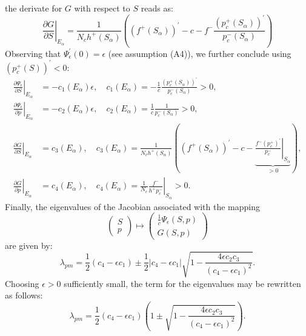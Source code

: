 \documentclass[smallextended]{svjour3}       %
\begin{document}
the derivate for $G$ with respect to $S$ reads as:
$$
\left. \frac{\partial G}{\partial S}  \right|_{E_\alpha} = \frac{1}{N_ch^+ \left( S_\alpha \right)}\left(  \left( f^+\left( S_\alpha \right) \right)^\prime -c  - f^- \frac{\left( p_c^+\left( S_\alpha \right) \right)^\prime }{p_c^-\left( S_\alpha \right)} \right)
$$
Observing that $\Psi_\epsilon^\prime \left(0 \right) = \epsilon$ (see assumption (A4)), we further conclude using $ \left( p_c^+ \left(S \right) \right)^\prime <0$:
\begin{align*}
\left. \frac{\partial \Psi_\epsilon}{\partial S}\right|_{E_\alpha}  &= -c_1\left( E_\alpha \right) \epsilon,\quad c_1\left( E_\alpha \right) = - \frac{1}{c}  
\frac{ \left( p_c^+ \left(S_\alpha \right) \right)^\prime }{ p_c^- \left(S_\alpha \right) } > 0, \\
\left. \frac{\partial \Psi_\epsilon}{\partial p}\right|_{E_\alpha}  &= -c_2\left( E_\alpha \right) \epsilon,\quad c_2\left( E_\alpha \right) = \frac{1}{c}  
\frac{1}{ p_c^- \left(S_\alpha \right) } > 0, \\
\left. \frac{\partial G}{\partial S} \right|_{E_\alpha} &= c_3\left( E_\alpha \right),\quad 
c_3\left( E_\alpha \right) =  \frac{1}{N_ch^+\left( S_\alpha \right)} \left(  \left( f^+\left( S_\alpha \right) \right)^\prime - c - 
 \underbrace{\left. \frac{ f^- \left( p_c^+ \right)^\prime}{p_c^-} \right|_{S_\alpha}}_{>0} \right), \\
\left. \frac{\partial G}{\partial p} \right|_{E_\alpha} &= c_4\left( E_\alpha \right),\quad c_4\left( E_\alpha \right) = \frac{1}{N_c}
\left. \frac{f^-}{h^+ p_c^-} \right|_{S_\alpha} >0.
\end{align*}
Finally, the eigenvalues of the Jacobian associated with the mapping
$$
\begin{pmatrix} S \\ p \end{pmatrix} \mapsto 
\begin{pmatrix} \frac{1}{c} \Psi_\epsilon\left(S,p \right) \\ G\left(S,p \right) \end{pmatrix}
$$
are given by:
$$
\lambda_{pm} = \frac{1}{2}\left( c_4 - \epsilon c_1 \right) \pm \frac{1}{2} \left| c_4 - \epsilon c_1 \right|
\sqrt{ 1- \frac{4 \epsilon c_2 c_3}{\left( c_4-\epsilon c_1\right)^2} }.
$$
Choosing $\epsilon>0$ sufficiently small, the term for the eigenvalues may be rewritten as follows:
$$
\lambda_{pm} = \frac{1}{2} \left( c_4 - \epsilon c_1 \right) \left( 1 \pm \sqrt{ 1- \frac{4 \epsilon c_2 c_3}{\left( c_4-\epsilon c_1\right)^2}} \right).
$$
\end{document}
